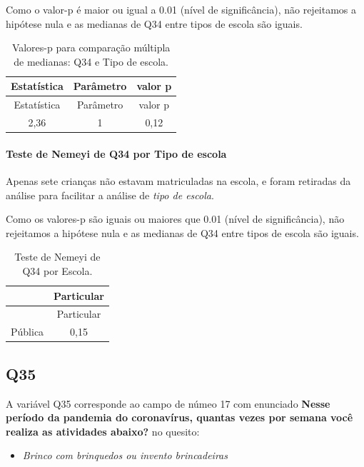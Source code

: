 \documentclass[]{article}
\providecommand{\tightlist}{%
  \setlength{\itemsep}{0pt}\setlength{\parskip}{0pt}}
\let\oldparagraph\paragraph
\renewcommand{\paragraph}[1]{\oldparagraph{#1}\mbox{}}
\begin{document}
Como o valor-p é maior ou igual a 0.01 (nível de significância), não rejeitamos a hipótese nula e as medianas de Q34 entre tipos de escola são iguais.

\begin{longtable}[]{@{}ccc@{}}
\caption{\label{tab:unnamed-chunk-1239}Valores-p para comparação múltipla de medianas: Q34 e Tipo de escola.}\tabularnewline
\toprule
Estatística & Parâmetro & valor p\tabularnewline
\midrule
\endfirsthead
\toprule
Estatística & Parâmetro & valor p\tabularnewline
\midrule
\endhead
2,36 & 1 & 0,12\tabularnewline
\bottomrule
\end{longtable}

\hypertarget{teste-de-nemeyi-de-q34-por-tipo-de-escola}{%
\paragraph{Teste de Nemeyi de Q34 por Tipo de escola}\label{teste-de-nemeyi-de-q34-por-tipo-de-escola}}

Apenas sete crianças não estavam matriculadas na escola, e foram retiradas da análise para facilitar a análise de \emph{tipo de escola}.

Como os valores-p são iguais ou maiores que 0.01 (nível de significância), não rejeitamos a hipótese nula e as medianas de Q34 entre tipos de escola são iguais.

\begin{longtable}[]{@{}lc@{}}
\caption{\label{tab:unnamed-chunk-1241}Teste de Nemeyi de Q34 por Escola.}\tabularnewline
\toprule
& Particular\tabularnewline
\midrule
\endfirsthead
\toprule
& Particular\tabularnewline
\midrule
\endhead
Pública & 0,15\tabularnewline
\bottomrule
\end{longtable}

\cleardoublepage

\hypertarget{q35}{%
\subsection{Q35}\label{q35}}

A variável Q35 corresponde ao campo de númeo 17 com enunciado \textbf{Nesse período da pandemia do coronavírus, quantas vezes por semana você realiza as atividades abaixo?} no quesito:

\begin{itemize}
\tightlist
\item
  \emph{Brinco com brinquedos ou invento brincadeiras}
\end{itemize}
\end{document}
